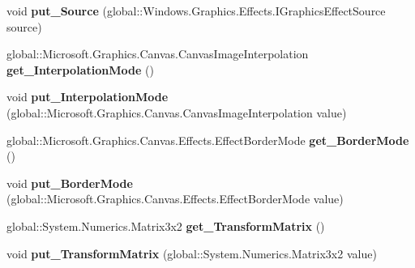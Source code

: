 \begin{DoxyCompactItemize}
void {\bfseries put\+\_\+\+Source} (global\+::\+Windows.\+Graphics.\+Effects.\+I\+Graphics\+Effect\+Source source)
\item 
\mbox{\label{interface_microsoft_1_1_graphics_1_1_canvas_1_1_effects_1_1_i_transform2_d_effect_a28c7f549ffaf7fe034240f0365a040f5}} 
global\+::\+Microsoft.\+Graphics.\+Canvas.\+Canvas\+Image\+Interpolation {\bfseries get\+\_\+\+Interpolation\+Mode} ()
\item 
\mbox{\label{interface_microsoft_1_1_graphics_1_1_canvas_1_1_effects_1_1_i_transform2_d_effect_a864876e7bc5994cb6e25e49e9a00b3bb}} 
void {\bfseries put\+\_\+\+Interpolation\+Mode} (global\+::\+Microsoft.\+Graphics.\+Canvas.\+Canvas\+Image\+Interpolation value)
\item 
\mbox{\label{interface_microsoft_1_1_graphics_1_1_canvas_1_1_effects_1_1_i_transform2_d_effect_abd77cabb47b8cf0111ae871cdedf9046}} 
global\+::\+Microsoft.\+Graphics.\+Canvas.\+Effects.\+Effect\+Border\+Mode {\bfseries get\+\_\+\+Border\+Mode} ()
\item 
\mbox{\label{interface_microsoft_1_1_graphics_1_1_canvas_1_1_effects_1_1_i_transform2_d_effect_a38434702873fe7cbe1f7303fd42c85de}} 
void {\bfseries put\+\_\+\+Border\+Mode} (global\+::\+Microsoft.\+Graphics.\+Canvas.\+Effects.\+Effect\+Border\+Mode value)
\item 
\mbox{\label{interface_microsoft_1_1_graphics_1_1_canvas_1_1_effects_1_1_i_transform2_d_effect_ac948729dfbfa255235037cd2b8a44715}} 
global\+::\+System.\+Numerics.\+Matrix3x2 {\bfseries get\+\_\+\+Transform\+Matrix} ()
\item 
\mbox{\label{interface_microsoft_1_1_graphics_1_1_canvas_1_1_effects_1_1_i_transform2_d_effect_a053a9b302520e44c813aa3355df1c959}} 
void {\bfseries put\+\_\+\+Transform\+Matrix} (global\+::\+System.\+Numerics.\+Matrix3x2 value)

\end{DoxyCompactItemize}
